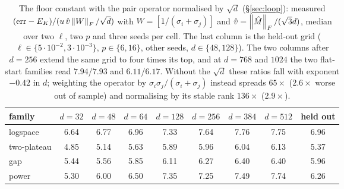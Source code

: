 \begin{table}[h]
\centering
\caption{The floor constant with the pair operator normalised by $\sqrt d$
(\S\ref{sec:loop}): measured $(\mathrm{err}-E_K)/(u\,\hat v\left\lVert W \right\rVert_F/\sqrt d)$ with
$W=[1/(\sigma_i+\sigma_j)]$ and $\hat v=\left\lVert \hat M \right\rVert_F/(\sqrt3 d)$, median over two
$\ell$, two $p$ and three seeds per cell.  The last column is the held-out grid
($\ell\in\{5\cdot10^{-2},3\cdot10^{-3}\}$, $p\in\{6,16\}$, other seeds, $d\in\{48,128\}$).
The two columns after $d=256$ extend the same grid to four times its top, and at
$d=768$ and $1024$ the two flat-start families read $7.94$/$7.93$ and $6.11$/$6.17$.
Without the $\sqrt d$ these ratios fall with exponent $-0.42$ in $d$; weighting the
operator by $\sigma_i\sigma_j/(\sigma_i+\sigma_j)$ instead spreads $65\times$
($2.6\times$ worse out of sample) and normalising by its stable rank $136\times$
($2.9\times$).}
\label{tab:dsinv}
\begin{tabular}{lcccccccc}
\toprule
family & $d=32$ & $d=48$ & $d=64$ & $d=128$ & $d=256$ & $d=384$ & $d=512$ & held out \\
\midrule
logspace & 6.64 & 6.77 & 6.96 & 7.33 & 7.64 & 7.76 & 7.75 & 6.96 \\
two-plateau & 4.85 & 5.14 & 5.63 & 5.89 & 5.96 & 6.04 & 6.13 & 5.37 \\
gap & 5.44 & 5.56 & 5.85 & 6.11 & 6.27 & 6.40 & 6.40 & 5.96 \\
power & 5.30 & 6.00 & 6.50 & 7.35 & 7.25 & 7.49 & 7.74 & 6.26 \\
\bottomrule
\end{tabular}
\end{table}

